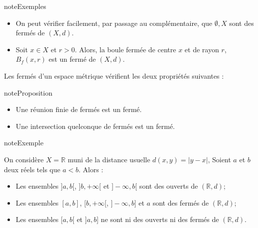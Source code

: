 \documentclass[letterpaper,10pt,french]{sphinxmanual}
\begin{document}
\begin{sphinxadmonition}{note}{Exemples}
\begin{itemize}
\item {} 
\sphinxAtStartPar
On peut vérifier facilement, par passage au complémentaire, que \(\emptyset, X\) sont des fermés de \((X, d)\).

\item {} 
\sphinxAtStartPar
Soit \(x\in X\) et \(r>0\). Alors, la boule fermée de centre \(x\) et de rayon \(r\), \(B_f(x,r)\) est un fermé de \((X, d)\).

\end{itemize}
\end{sphinxadmonition}

\sphinxAtStartPar
Les fermés d’un espace métrique vérifient les deux propriétés suivantes :

\begin{sphinxadmonition}{note}{Proposition}
\begin{itemize}
\item {} 
\sphinxAtStartPar
Une réunion finie de fermés est un fermé.

\item {} 
\sphinxAtStartPar
Une intersection quelconque de fermés est un fermé.

\end{itemize}
\end{sphinxadmonition}

\begin{sphinxadmonition}{note}{Exemple}

\sphinxAtStartPar
On considère \(X=\mathbb R\) muni de la distance usuelle \(d(x,y)=|y-x|\), Soient \(a\) et \(b\) deux réels tels que \(a<b\). Alors :
\begin{itemize}
\item {} 
\sphinxAtStartPar
Les ensembles \(]a, b[\), \(]b, +\infty[\) et \(]-\infty, b[\) sont des ouverts de \((\mathbb R, d)\);

\item {} 
\sphinxAtStartPar
Les ensembles \([a, b]\), \([b, +\infty[\), \(]-\infty, b]\) et \({a}\) sont des fermés de \((\mathbb R, d)\);

\item {} 
\sphinxAtStartPar
Les ensembles \([a, b[\) et \(]a, b]\) ne sont ni des ouverts ni des fermés de \((\mathbb R, d)\).

\end{itemize}
\end{sphinxadmonition}
\end{document}
